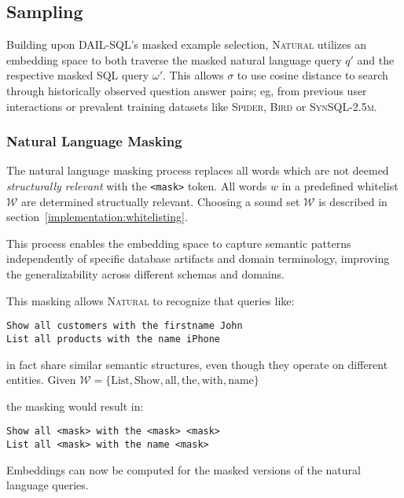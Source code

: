 \subsection{Sampling}\label{design:sampling}

Building upon DAIL-SQL's masked example selection, \textsc{Natural} utilizes an
embedding space to both traverse the masked natural language query $q'$
and the respective masked SQL query $\omega'$. This allows $\sigma$ to use
cosine distance to search through historically observed question answer pairs;
eg, from previous user interactions or prevalent training datasets like
\textsc{Spider}, \textsc{Bird} or \textsc{SynSQL-2.5m}.

\subsubsection{Natural Language Masking}

The natural language masking process replaces all words which are not deemed
\textit{structurally relevant} with the \texttt{<mask>} token. All words $w$
in a predefined whitelist $\mathcal{W}$ are determined structually relevant.
Choosing a sound set $\mathcal{W}$ is described in section~\ref{implementation:whitelisting}.

This process enables the embedding space to capture semantic patterns independently
of specific database artifacts and domain terminology, improving the generalizability
across different schemas and domains.

This masking allows \textsc{Natural} to recognize that queries like:

\begin{verbatim}
Show all customers with the firstname John
List all products with the name iPhone
\end{verbatim}

in fact share similar semantic structures, even though they operate on different entities.
Given $\mathcal{W} = \{\text{List}, \text{Show}, \text{all}, \text{the}, \text{with}, \text{name}\}$

the masking would result in:

\begin{verbatim}
Show all <mask> with the <mask> <mask>
List all <mask> with the name <mask>
\end{verbatim}

Embeddings can now be computed for the masked versions of the natural language queries.

